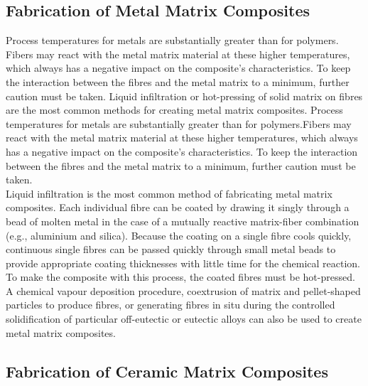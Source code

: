 \documentclass{article}
\begin{document}
\begin{multicols}{2}
\subsection{Fabrication of Metal Matrix Composites}

Process temperatures for metals are substantially greater than for polymers. Fibers may react with the metal matrix material at these higher temperatures, which always has a negative impact on the composite's characteristics. To keep the interaction between the fibres and the metal matrix to a minimum, further caution must be taken. Liquid infiltration or hot-pressing of solid matrix on fibres are the most common methods for creating metal matrix composites. Process temperatures for metals are substantially greater than for polymers.Fibers may react with the metal matrix material at these higher temperatures, which always has a negative impact on the composite's characteristics. To keep the interaction between the fibres and the metal matrix to a minimum, further caution must be taken.\\

Liquid infiltration is the most common method of fabricating metal matrix composites. Each individual fibre can be coated by drawing it singly through a bead of molten metal in the case of a mutually reactive matrix-fiber combination (e.g., aluminium and silica). Because the coating on a single fibre cools quickly, continuous single fibres can be passed quickly through small metal beads to provide appropriate coating thicknesses with little time for the chemical reaction. To make the composite with this process, the coated fibres must be hot-pressed.\\

A chemical vapour deposition procedure, coextrusion of matrix and pellet-shaped particles to produce fibres, or generating fibres in situ during the controlled solidification of particular off-eutectic or eutectic alloys can also be used to create metal matrix composites.

\subsection{Fabrication of Ceramic Matrix Composites}


\end{multicols}
\end{document}
